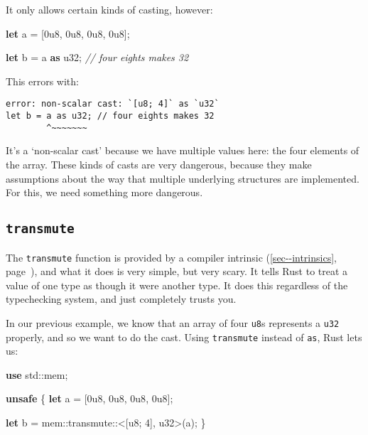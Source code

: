 \documentclass[a4paper,]{book}
\renewcommand*{\hyperref}[2][\ar]{%
  \def\ar{#2}%
  #2 (\autoref{#1}, page~\pageref{#1})}
\newenvironment{Shaded}{\begin{snugshade}}{\end{snugshade}}
\newcommand{\KeywordTok}[1]{\textcolor[rgb]{0.13,0.29,0.53}{\textbf{{#1}}}}
\newcommand{\DataTypeTok}[1]{\textcolor[rgb]{0.13,0.29,0.53}{{#1}}}
\newcommand{\DecValTok}[1]{\textcolor[rgb]{0.00,0.00,0.81}{{#1}}}
\newcommand{\CommentTok}[1]{\textcolor[rgb]{0.56,0.35,0.01}{\textit{{#1}}}}
\newcommand{\NormalTok}[1]{{#1}}
\begin{document}
It only allows certain kinds of casting, however:

\begin{Shaded}
\begin{Highlighting}[]
\KeywordTok{let} \NormalTok{a = [}\DecValTok{0u8}\NormalTok{, }\DecValTok{0u8}\NormalTok{, }\DecValTok{0u8}\NormalTok{, }\DecValTok{0u8}\NormalTok{];}

\KeywordTok{let} \NormalTok{b = a }\KeywordTok{as} \DataTypeTok{u32}\NormalTok{; }\CommentTok{// four eights makes 32}
\end{Highlighting}
\end{Shaded}

This errors with:

\begin{verbatim}
error: non-scalar cast: `[u8; 4]` as `u32`
let b = a as u32; // four eights makes 32
        ^~~~~~~~
\end{verbatim}

It's a `non-scalar cast' because we have multiple values here: the four
elements of the array. These kinds of casts are very dangerous, because
they make assumptions about the way that multiple underlying structures
are implemented. For this, we need something more dangerous.

\subsection{\texorpdfstring{\texttt{transmute}}{transmute}}\label{transmute}

The \texttt{transmute} function is provided by a
\hyperref[sec--intrinsics]{compiler intrinsic}, and what it does is very
simple, but very scary. It tells Rust to treat a value of one type as
though it were another type. It does this regardless of the typechecking
system, and just completely trusts you.

In our previous example, we know that an array of four \texttt{u8}s
represents a \texttt{u32} properly, and so we want to do the cast. Using
\texttt{transmute} instead of \texttt{as}, Rust lets us:

\begin{Shaded}
\begin{Highlighting}[]
\KeywordTok{use} \NormalTok{std::mem;}

\KeywordTok{unsafe} \NormalTok{\{}
    \KeywordTok{let} \NormalTok{a = [}\DecValTok{0u8}\NormalTok{, }\DecValTok{0u8}\NormalTok{, }\DecValTok{0u8}\NormalTok{, }\DecValTok{0u8}\NormalTok{];}

    \KeywordTok{let} \NormalTok{b = mem::transmute::<[}\DataTypeTok{u8}\NormalTok{; }\DecValTok{4}\NormalTok{], }\DataTypeTok{u32}\NormalTok{>(a);}
\NormalTok{\}}
\end{Highlighting}
\end{Shaded}
\end{document}
